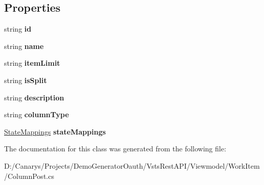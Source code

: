 \subsection*{Properties}
\begin{DoxyCompactItemize}
\item 
\mbox{\label{class_vsts_rest_a_p_i_1_1_viewmodel_1_1_work_item_1_1_column_post_a2a3851567272f18669086141c11c3172}} 
string {\bfseries id}
\item 
\mbox{\label{class_vsts_rest_a_p_i_1_1_viewmodel_1_1_work_item_1_1_column_post_aa022ffbeabf0a1eb2878a0eafb7f3a2b}} 
string {\bfseries name}
\item 
\mbox{\label{class_vsts_rest_a_p_i_1_1_viewmodel_1_1_work_item_1_1_column_post_afe27cad2954eb9f89d7ce36563756fd5}} 
string {\bfseries item\+Limit}
\item 
\mbox{\label{class_vsts_rest_a_p_i_1_1_viewmodel_1_1_work_item_1_1_column_post_ac28734984da3475d7e3bee6e4921d200}} 
string {\bfseries is\+Split}
\item 
\mbox{\label{class_vsts_rest_a_p_i_1_1_viewmodel_1_1_work_item_1_1_column_post_a5ca1c1147bb56c508dc89181d37d8a99}} 
string {\bfseries description}
\item 
\mbox{\label{class_vsts_rest_a_p_i_1_1_viewmodel_1_1_work_item_1_1_column_post_af2a5aa290684d42398cd836593fb974b}} 
string {\bfseries column\+Type}
\item 
\mbox{\label{class_vsts_rest_a_p_i_1_1_viewmodel_1_1_work_item_1_1_column_post_abefd7fea4e7eb7b1013ab972ed67d21c}} 
\mbox{\hyperlink{class_vsts_rest_a_p_i_1_1_viewmodel_1_1_work_item_1_1_state_mappings}{State\+Mappings}} {\bfseries state\+Mappings}
\end{DoxyCompactItemize}


The documentation for this class was generated from the following file\+:\begin{DoxyCompactItemize}
\item 
D\+:/\+Canarys/\+Projects/\+Demo\+Generator\+Oauth/\+Vsts\+Rest\+A\+P\+I/\+Viewmodel/\+Work\+Item/Column\+Post.\+cs\end{DoxyCompactItemize}
